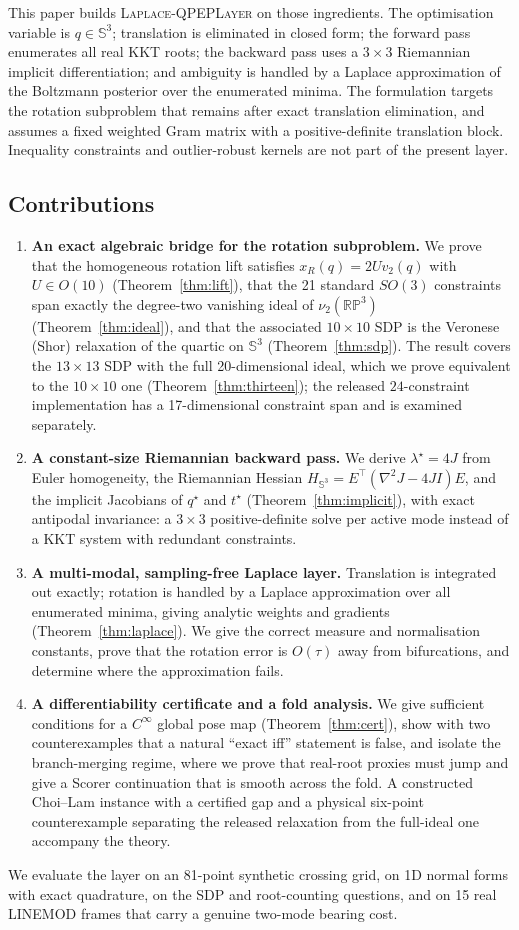 This paper builds \textsc{Laplace-QPEPLayer} on those ingredients. The optimisation variable is $q\in\mathbb{S}^3$; translation is eliminated in closed form; the forward pass enumerates all real KKT roots; the backward pass uses a $3\times3$ Riemannian implicit differentiation; and ambiguity is handled by a Laplace approximation of the Boltzmann posterior over the enumerated minima. The formulation targets the rotation subproblem that remains after exact translation elimination, and assumes a fixed weighted Gram matrix with a positive-definite translation block. Inequality constraints and outlier-robust kernels are not part of the present layer.

\subsection{Contributions}

\begin{enumerate}
\item \textbf{An exact algebraic bridge for the rotation subproblem.} We prove that the homogeneous rotation lift satisfies $x_R(q)=2Uv_2(q)$ with $U\in O(10)$ (Theorem~\ref{thm:lift}), that the 21 standard $SO(3)$ constraints span exactly the degree-two vanishing ideal of $\nu_2(\mathbb{RP}^3)$ (Theorem~\ref{thm:ideal}), and that the associated $10\times10$ SDP is the Veronese (Shor) relaxation of the quartic on $\mathbb{S}^3$ (Theorem~\ref{thm:sdp}). The result covers the $13\times13$ SDP with the full 20-dimensional ideal, which we prove equivalent to the $10\times10$ one (Theorem~\ref{thm:thirteen}); the released $24$-constraint implementation has a 17-dimensional constraint span and is examined separately.
\item \textbf{A constant-size Riemannian backward pass.} We derive $\lambda^\star=4J$ from Euler homogeneity, the Riemannian Hessian $H_{\mathbb{S}^3}=E^\top(\nabla^2J-4JI)E$, and the implicit Jacobians of $q^\star$ and $t^\star$ (Theorem~\ref{thm:implicit}), with exact antipodal invariance: a $3\times3$ positive-definite solve per active mode instead of a KKT system with redundant constraints.
\item \textbf{A multi-modal, sampling-free Laplace layer.} Translation is integrated out exactly; rotation is handled by a Laplace approximation over all enumerated minima, giving analytic weights and gradients (Theorem~\ref{thm:laplace}). We give the correct measure and normalisation constants, prove that the rotation error is $O(\tau)$ away from bifurcations, and determine where the approximation fails.
\item \textbf{A differentiability certificate and a fold analysis.} We give sufficient conditions for a $C^\infty$ global pose map (Theorem~\ref{thm:cert}), show with two counterexamples that a natural ``exact iff'' statement is false, and isolate the branch-merging regime, where we prove that real-root proxies must jump and give a Scorer continuation that is smooth across the fold. A constructed Choi--Lam instance with a certified gap and a physical six-point counterexample separating the released relaxation from the full-ideal one accompany the theory.
\end{enumerate}

We evaluate the layer on an 81-point synthetic crossing grid, on 1D normal forms with exact quadrature, on the SDP and root-counting questions, and on 15 real LINEMOD frames that carry a genuine two-mode bearing cost.
